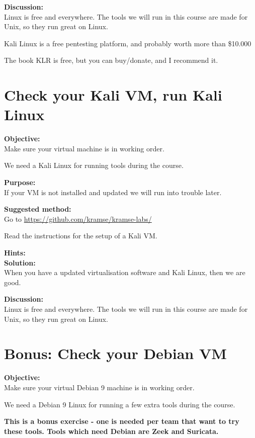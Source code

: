 \documentclass[a4paper,11pt,notitlepage]{report}
\begin{document}
{\bf Discussion:}\\
Linux is free and everywhere. The tools we will run in this course are made for Unix, so they run great on Linux.

Kali Linux is a free pentesting platform, and probably worth more than \$10.000

The book KLR is free, but you can buy/donate, and I recommend it.

\chapter{Check your Kali VM, run Kali Linux}
\label{ex:basicVM}


{\bf Objective:}\\
Make sure your virtual machine is in working order.

We need a Kali Linux for running tools during the course.

{\bf Purpose:}\\
If your VM is not installed and updated we will run into trouble later.

{\bf Suggested method:}\\
Go to \url{https://github.com/kramse/kramse-labs/}

Read the instructions for the setup of a Kali VM.

{\bf Hints:}\\

{\bf Solution:}\\
When you have a updated virtualisation software and Kali Linux, then we are good.

{\bf Discussion:}\\
Linux is free and everywhere. The tools we will run in this course are made for Unix, so they run great on Linux.

\chapter{Bonus: Check your Debian VM}
\label{ex:basicDebianVM}


{\bf Objective:}\\
Make sure your virtual Debian 9 machine is in working order.

We need a Debian 9 Linux for running a few extra tools during the course.

{\Large \bf This is a bonus exercise - one is needed per team that want to try these tools. Tools which need Debian are Zeek and Suricata.}
\end{document}
